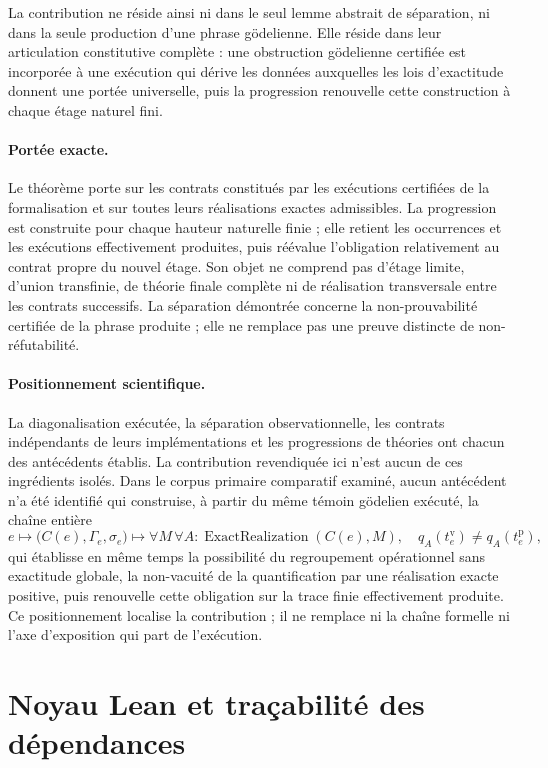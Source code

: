 \documentclass[11pt,a4paper]{article}
\newcommand{\ExactRealization}{\operatorname{ExactRealization}}
\theoremstyle{remark}
\begin{document}
La contribution ne réside ainsi ni dans le seul lemme abstrait de séparation,
ni dans la seule production d'une phrase gödelienne. Elle réside dans leur
articulation constitutive complète : une obstruction gödelienne certifiée est
incorporée à une exécution qui dérive les données auxquelles les lois
d'exactitude donnent une portée universelle, puis la progression renouvelle
cette construction à chaque étage naturel fini.

\paragraph{Portée exacte.}
Le théorème porte sur les contrats constitués par les exécutions certifiées
de la formalisation et sur toutes leurs réalisations exactes admissibles.
La progression est construite pour chaque hauteur naturelle finie ; elle
retient les occurrences et les exécutions effectivement produites, puis
réévalue l'obligation relativement au contrat propre du nouvel étage. Son
objet ne comprend pas d'étage limite, d'union transfinie, de théorie finale
complète ni de réalisation transversale entre les contrats successifs. La
séparation démontrée concerne la non-prouvabilité certifiée de la phrase
produite ; elle ne remplace pas une preuve distincte de non-réfutabilité.

\paragraph{Positionnement scientifique.}
La diagonalisation exécutée, la séparation observationnelle, les contrats
indépendants de leurs implémentations et les progressions de théories ont
chacun des antécédents établis. La contribution revendiquée ici n'est aucun
de ces ingrédients isolés. Dans le corpus primaire comparatif examiné, aucun
antécédent n'a été identifié qui construise, à partir du même témoin
gödelien exécuté, la chaîne entière
\[
e\longmapsto\bigl(C(e),\Gamma_e,\sigma_e\bigr)
\longmapsto
\forall M\,\forall A:\ExactRealization(C(e),M),\quad
q_A(t_e^{\mathrm v})\neq q_A(t_e^{\mathrm p}),
\]
qui établisse en même temps la possibilité du regroupement opérationnel sans
exactitude globale, la non-vacuité de la quantification par une réalisation
exacte positive, puis renouvelle cette obligation sur la trace finie
effectivement produite. Ce positionnement localise la contribution ; il ne
remplace ni la chaîne formelle ni l'axe d'exposition qui part de l'exécution.

\section{Noyau Lean et traçabilité des dépendances}
\label{sec:lean}
\end{document}
